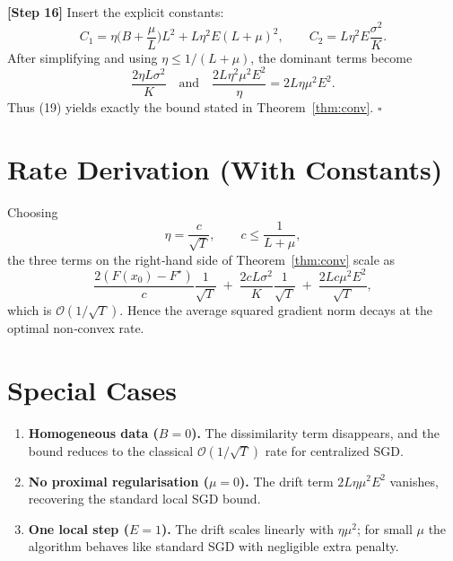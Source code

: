 \documentclass[11pt]{article}
\begin{document}
\noindent\textbf{[Step 16]} Insert the explicit constants:
\[
C_{1}= \eta\Big(B+\frac{\mu}{L}\Big)L^{2}+L\eta^{2}E(L+\mu)^{2},
\qquad
C_{2}=L\eta^{2}E\frac{\sigma^{2}}{K}.
\]
After simplifying and using $\eta\le 1/(L+\mu)$, the dominant terms become
\[
\frac{2\eta L\sigma^{2}}{K}
\quad\text{and}\quad
\frac{2L\eta^{2}\mu^{2}E^{2}}{\eta}=2L\eta\mu^{2}E^{2}.
\]
Thus (19) yields exactly the bound stated in Theorem~\ref{thm:conv}. \hfill $\square$

\section*{Rate Derivation (With Constants)}
Choosing 
\[
\eta = \frac{c}{\sqrt{T}},\qquad c\le \frac{1}{L+\mu},
\]
the three terms on the right‑hand side of Theorem~\ref{thm:conv} scale as
\[
\frac{2(F(x_0)-F^\star)}{c}\frac{1}{\sqrt{T}}
\;+\;
\frac{2cL\sigma^{2}}{K}\frac{1}{\sqrt{T}}
\;+\;
\frac{2L c\mu^{2}E^{2}}{\sqrt{T}},
\]
which is $\mathcal{O}(1/\sqrt{T})$. Hence the average squared gradient norm decays at the optimal non‑convex rate.

\section*{Special Cases}
\begin{enumerate}[label=\alph*)]
\item \textbf{Homogeneous data ($B=0$).} The dissimilarity term disappears, and the bound reduces to the classical $\mathcal{O}(1/\sqrt{T})$ rate for centralized SGD.
\item \textbf{No proximal regularisation ($\mu=0$).} The drift term $2L\eta\mu^{2}E^{2}$ vanishes, recovering the standard local SGD bound.
\item \textbf{One local step ($E=1$).} The drift scales linearly with $\eta\mu^{2}$; for small $\mu$ the algorithm behaves like standard SGD with negligible extra penalty.
\end{enumerate}
\end{document}
